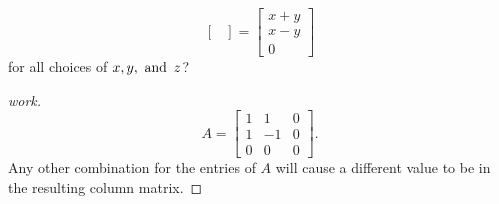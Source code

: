 \documentclass{article}
\begin{document}
\begin{enumerate}
{\[\begin{bmatrix}
            \end{bmatrix} =
            \begin{bmatrix}
                x+y \\
                x-y \\
                0
            \end{bmatrix}
        \]
        for all choices of $x, y, \operatorname{~\text{and}~} z$?}
    \begin{proof}[work]
        \[
            A = \begin{bmatrix}
                1 & 1  & 0 \\
                1 & -1 & 0 \\
                0 & 0  & 0
            \end{bmatrix}.
        \]
        Any other combination for the entries of $A$ will cause a different value to be in the resulting column matrix.
    \end{proof}
\end{enumerate}
\end{document}
